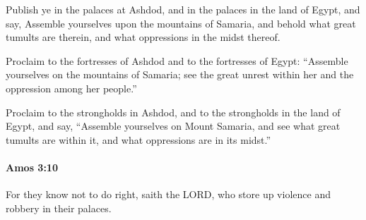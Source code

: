 			\begin{versebox}
					\item[BHS] 
					\item[LXX] 
					\item[ASV] Publish ye in the palaces at Ashdod, and in the palaces in the land of Egypt, and say, Assemble yourselves upon the mountains of Samaria, and behold what great tumults are therein, and what oppressions in the midst thereof.
					\item[NIV] Proclaim to the fortresses of Ashdod and to the fortresses of Egypt: “Assemble yourselves on the mountains of Samaria; see the great unrest within her and the oppression among her people.”
					\item[NRSV] Proclaim to the strongholds in Ashdod, and to the strongholds in the land of Egypt, and say, “Assemble yourselves on Mount Samaria, and see what great tumults are within it, and what oppressions are in its midst.”
			\end{versebox}

		\paragraph{Amos 3:10} %
			\label{AMOS-3-10}

			For they know not to do right, saith the LORD, who store up violence and robbery in their palaces.

